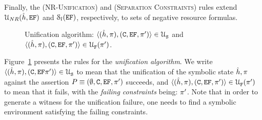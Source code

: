 Finally, the (\textsc{NR-Unification}) and (\textsc{Separation Constraints}) rules extend ${\cal U}_{NR}(\hat{h}, \mathtt{EF})$ and ${\cal S}_{l}(\mathtt{EF})$, respectively, to sets of negative resource formulas.

\begin{figure}[t!]
{\scriptsize
\centering
{}}
\vspace*{-0.6cm}
\caption{Unification algorithm: {\small $\langle (\hat{h}, \pi), (\mathtt{C}, \mathtt{EF}, \pi') \rangle \in {\cal U}_{\mathtt{S}}^{}$}
and {\small $\langle (\hat{h}, \pi), (\mathtt{C}, \mathtt{EF}, \pi') \rangle \in {\cal U}_{\mathtt{F}}^{}(\pi')$}.\label{unification:algorithm}}
\vspace*{-0.3cm}
\end{figure}


Figure~\ref{unification:algorithm} presents the rules for the \emph{unification algorithm}. 
We write $\langle (\hat{h}, \pi), (\mathtt{C}, \mathtt{EF} \pi') \rangle \in {\cal U}_{\mathtt{S}}^{}$ to mean that the unification of 
the symbolic state $\hat{h}, \pi$ against the assertion $P \equiv (\emptyset, \mathtt{C}, \mathtt{EF}, \pi')$ 
succeeds, and $\langle (\hat{h}, \pi), (\mathtt{C}, \mathtt{EF}, \pi') \rangle \in {\cal U}_{\mathtt{F}}^{}(\pi')$ to mean that it
fails, with the \emph{failing constraints} being: $\pi'$. Note that in order to generate a 
witness for the unification failure, one needs to find a symbolic environment satisfying the 
failing constraints.

